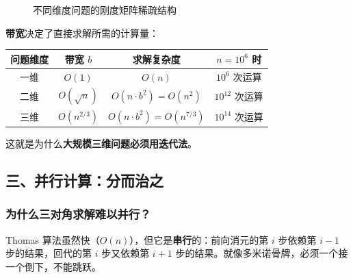 \begin{figure}[htbp]
\caption{不同维度问题的刚度矩阵稀疏结构}
\end{figure}


\textbf{带宽}决定了直接求解所需的计算量：

\begin{center}
\begin{tabular}{c|c|c|c}
\toprule
问题维度 & 带宽 $b$ & 求解复杂度 & $n = 10^6$ 时 \\
\midrule
一维 & $O(1)$ & $O(n)$ & $10^6$ 次运算 \\
二维 & $O(\sqrt{n})$ & $O(n \cdot b^2) = O(n^2)$ & $10^{12}$ 次运算 \\
三维 & $O(n^{2/3})$ & $O(n \cdot b^2) = O(n^{7/3})$ & $10^{14}$ 次运算 \\
\bottomrule
\end{tabular}
\end{center}

这就是为什么\textbf{大规模三维问题必须用迭代法}。

\subsection*{三、并行计算：分而治之}

\subsubsection*{为什么三对角求解难以并行？}

Thomas 算法虽然快（$O(n)$），但它是\textbf{串行}的：前向消元的第 $i$ 步依赖第 $i-1$ 步的结果，回代的第 $i$ 步又依赖第 $i+1$ 步的结果。就像多米诺骨牌，必须一个接一个倒下，不能跳跃。

